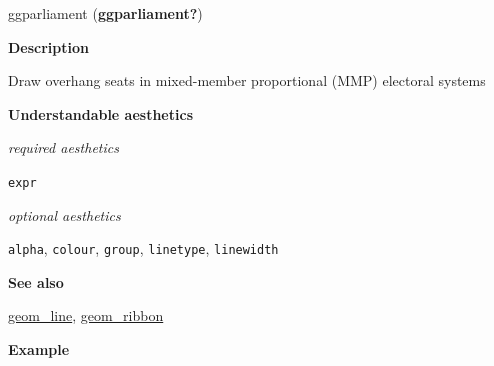 \documentclass[
  letterpaper,
  DIV=11,
  numbers=noendperiod]{scrreprt}
\begin{document}
ggparliament (\textbf{ggparliament?})

\textbf{Description}

Draw overhang seats in mixed-member proportional (MMP) electoral systems

\textbf{Understandable aesthetics}

\emph{required aesthetics}

\texttt{expr}

\emph{optional aesthetics}

\texttt{alpha}, \texttt{colour}, \texttt{group}, \texttt{linetype},
\texttt{linewidth}

\textbf{See also}

\hyperref[line]{geom\_line}, \hyperref[ribbon]{geom\_ribbon}

\textbf{Example}
\end{document}
